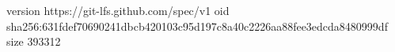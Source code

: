 version https://git-lfs.github.com/spec/v1
oid sha256:631fdef70690241dbcb420103c95d197c8a40c2226aa88fee3edcda8480999df
size 393312

